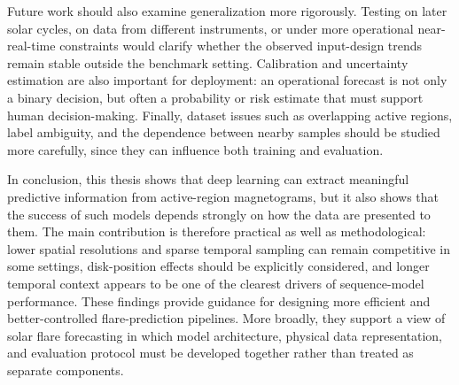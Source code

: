 Future work should also examine generalization more rigorously. Testing on later solar cycles, on data from different instruments, or under more operational near-real-time constraints would clarify whether the observed input-design trends remain stable outside the benchmark setting. Calibration and uncertainty estimation are also important for deployment: an operational forecast is not only a binary decision, but often a probability or risk estimate that must support human decision-making. Finally, dataset issues such as overlapping active regions, label ambiguity, and the dependence between nearby samples should be studied more carefully, since they can influence both training and evaluation.

In conclusion, this thesis shows that deep learning can extract meaningful predictive information from active-region magnetograms, but it also shows that the success of such models depends strongly on how the data are presented to them. The main contribution is therefore practical as well as methodological: lower spatial resolutions and sparse temporal sampling can remain competitive in some settings, disk-position effects should be explicitly considered, and longer temporal context appears to be one of the clearest drivers of sequence-model performance. These findings provide guidance for designing more efficient and better-controlled flare-prediction pipelines. More broadly, they support a view of solar flare forecasting in which model architecture, physical data representation, and evaluation protocol must be developed together rather than treated as separate components.
